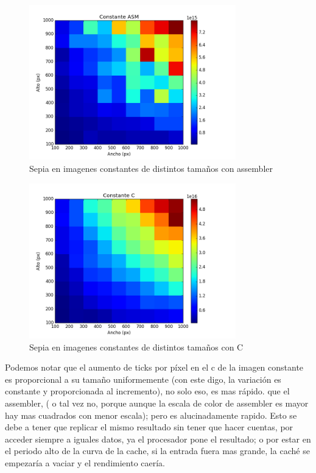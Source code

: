    
   \begin{figure} [H]
  \centering
  \includegraphics[width=0.8\textwidth]{recursos/constantesepiaasm.png}
    \caption{ Sepia en imagenes constantes de distintos tamaños con assembler }
\end{figure}
 
 \begin{figure} [H]
  \centering
  \includegraphics[width=0.8\textwidth]{recursos/constantesepiac.png}
    \caption{ Sepia en imagenes constantes de distintos tamaños con C }
\end{figure}
 
   
   \hfill \break
   
   
   Podemos notar que  el aumento de ticks por píxel en el c de la imagen constante es proporcional a su tamaño uniformemente (con este digo, la variación es constante y proporcionada al incremento), no solo eso, es mas rápido. que el assembler, ( o tal vez no, porque aunque la escala de color de assembler es mayor  hay mas cuadrados con menor escala); pero es alucinadamente rapido. Esto se debe a tener que replicar el mismo resultado sin tener que hacer cuentas, por acceder siempre a iguales datos, ya el procesador pone el resultado; o por estar en el periodo alto de la curva de la cache, si la entrada fuera mas grande, la caché se empezaría a vaciar y el rendimiento caería.
   
